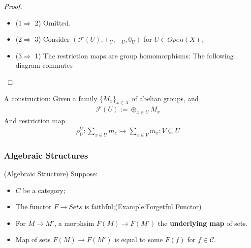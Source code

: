 \documentclass[Total.tex]{subfiles}
\begin{document}
				\begin{proof}
					\begin{itemize}
						\item (1$\Rightarrow$ 2) Omitted.
						\item (2$\Rightarrow$ 3) Consider $(\mathcal{F}(U),+_U,-_U,0_U)$ for $U\in Open(X)$;
						\item (3$\Rightarrow$ 1) The restriction maps are group homomorphisms: The following diagram commutes
						
						\begin{center}
						\end{center}
					\end{itemize}
				\end{proof}
				
				
				\begin{example}
					A construction: Given a family $\{M_x\}_{x\in X}$ of abelian groups, and
					\begin{gather*}
						\mathcal{F}(U):=\oplus_{x\in U} M_x
					\end{gather*}
					And restriction map
					\begin{gather*}
						\rho_U^V:\sum_{x\in U} m_x\mapsto \sum_{x\in V} m_x;V\subseteq U
					\end{gather*}
				\end{example}
				
				
				\subsubsection{Algebraic Structures}
				
				\begin{Def}
					(Algebraic Structure) Suppose:
					
					\begin{itemize}
						\item $C$ be a category;
						\item The functor $F\rightarrow Sets$ is faithful;(Example:Forgetful Functor)
						
						\item For $M\rightarrow M'$, a morphsim $F(M)\rightarrow F(M')$ the \textbf{underlying map} of sets.
						\item Map of sets $F(M)\rightarrow F(M')$ is equal to some $F(f)$ for $f\in \mathcal{C}$.
					\end{itemize}
				\end{Def}
				
\end{document}
